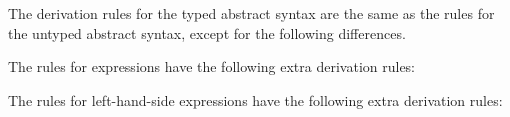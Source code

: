 The derivation rules for the typed abstract syntax are the same as the rules for the untyped abstract syntax,
except for the following differences.

The rules for expressions have the following extra derivation rules:

The rules for left-hand-side expressions have the following extra derivation rules:
\hypertarget{ast-LESetCollectionFields}{}
\hypertarget{ast-LESetEnumArray}{}
\hypertarget{ast-EGetCollectionFields}{}
\hypertarget{ast-EGetEnumArray}{}
\hypertarget{ast-EEnumArray}{}
\hypertarget{ast-EArray}{}
\hypertarget{ast-EGetItem}{}

